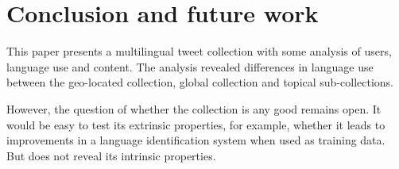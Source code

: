 \documentclass{IOS-Book-Article}
\begin{document}


\section{Conclusion and future work}
\label{sec:conclusion}


This paper presents a multilingual tweet collection with some analysis of users, language use and content. The analysis revealed differences in language use between the geo-located collection, global collection and topical sub-collections.

However, the question of whether the collection is any good remains open. It would be easy to test its extrinsic properties, for example, whether it leads to improvements in a language identification system when used as training data. But does not reveal its intrinsic properties.






\end{document}
